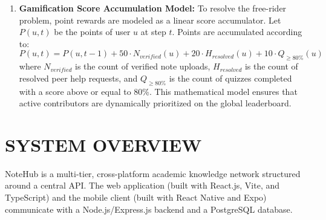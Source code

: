 \documentclass[12,Times new Roman,a4paper]{report}
\begin{document}
\begin{enumerate}
    \item \textbf{Gamification Score Accumulation Model:} To resolve the free-rider problem, point rewards are modeled as a linear score accumulator. Let $P(u, t)$ be the points of user $u$ at step $t$. Points are accumulated according to:
    \begin{equation}
    P(u, t) = P(u, t-1) + 50 \cdot N_{verified}(u) + 20 \cdot H_{resolved}(u) + 10 \cdot Q_{\ge 80\%}(u)
    \end{equation}
    where $N_{verified}$ is the count of verified note uploads, $H_{resolved}$ is the count of resolved peer help requests, and $Q_{\ge 80\%}$ is the count of quizzes completed with a score above or equal to 80\%. This mathematical model ensures that active contributors are dynamically prioritized on the global leaderboard.
\end{enumerate}

\section{SYSTEM OVERVIEW}
NoteHub is a multi-tier, cross-platform academic knowledge network structured around a central API. The web application (built with React.js, Vite, and TypeScript) and the mobile client (built with React Native and Expo) communicate with a Node.js/Express.js backend and a PostgreSQL database.
\end{document}
